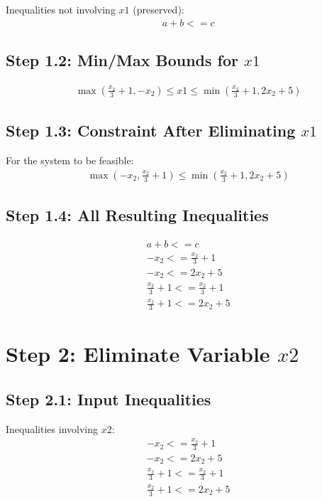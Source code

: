 \documentclass{article}
\begin{document}
Inequalities not involving $x1$ (preserved):
\begin{align}
& a + b <= c
\end{align}

\subsection{Step 1.2: Min/Max Bounds for $x1$}

\begin{align}
& \max\left(\frac{x_{2}}{3} + 1, - x_{2}\right) \leq x1 \leq \min\left(\frac{x_{2}}{3} + 1, 2 x_{2} + 5\right)
\end{align}

\subsection{Step 1.3: Constraint After Eliminating $x1$}

For the system to be feasible:
\begin{align}
& \max\left(- x_{2}, \frac{x_{2}}{3} + 1\right) \leq \min\left(\frac{x_{2}}{3} + 1, 2 x_{2} + 5\right)
\end{align}

\subsection{Step 1.4: All Resulting Inequalities}

\begin{align}
& a + b <= c \\
& - x_{2} <= \frac{x_{2}}{3} + 1 \\
& - x_{2} <= 2 x_{2} + 5 \\
& \frac{x_{2}}{3} + 1 <= \frac{x_{2}}{3} + 1 \\
& \frac{x_{2}}{3} + 1 <= 2 x_{2} + 5
\end{align}

\section{Step 2: Eliminate Variable $x2$}

\subsection{Step 2.1: Input Inequalities}

Inequalities involving $x2$:
\begin{align}
& - x_{2} <= \frac{x_{2}}{3} + 1 \\
& - x_{2} <= 2 x_{2} + 5 \\
& \frac{x_{2}}{3} + 1 <= \frac{x_{2}}{3} + 1 \\
& \frac{x_{2}}{3} + 1 <= 2 x_{2} + 5
\end{align}
\end{document}

